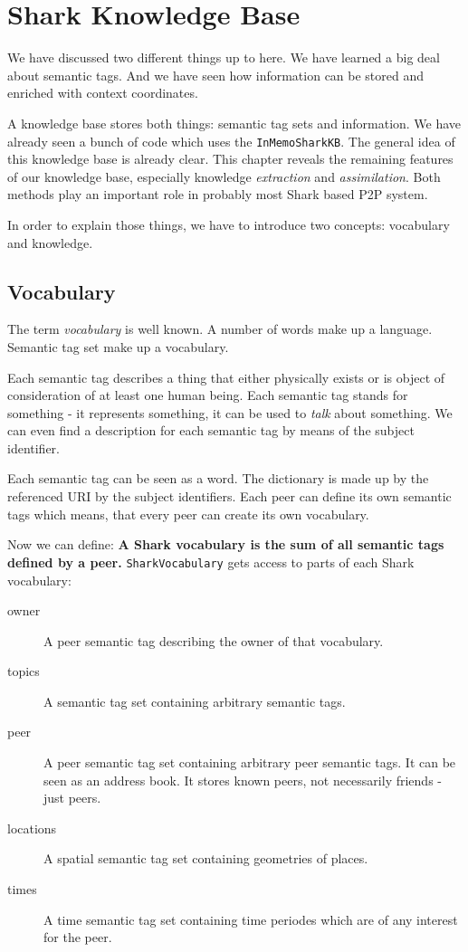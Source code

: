 \chapter{Shark Knowledge Base}
\label{sec:sharkkb}
We have discussed two different things up to here. We have learned a big deal about semantic tags. And we have seen how information can be stored and enriched with context coordinates.

A knowledge base stores both things: semantic tag sets and information. We have already seen a bunch of code which uses the {\tt InMemoSharkKB}. The general idea of this knowledge base is already clear. This chapter reveals the remaining features of our knowledge base, especially knowledge {\it extraction} and {\it assimilation}. Both methods play an important role in probably most Shark based P2P system.

In order to explain those things, we have to introduce two concepts: vocabulary and knowledge.

\section{Vocabulary}
The term {\it vocabulary} is well known. A number of words make up a language. Semantic tag set make up a vocabulary.

Each semantic tag describes a thing that either physically exists or is object of consideration of at least one human being. Each semantic tag stands for something - it represents something, it can be used to {\it talk} about something. We can even find a description for each semantic tag by means of the subject identifier. 

Each semantic tag can be seen as a word. The dictionary is made up by the referenced URI by the subject identifiers. Each peer can define its own semantic tags which means, that every peer can create its own vocabulary.

Now we can define: {\bf A Shark vocabulary is the sum of all semantic tags defined by a peer.} {\tt SharkVocabulary} gets access to parts of each Shark vocabulary:

\begin{description}
\item[owner] A peer semantic tag describing the owner of that vocabulary.
\item[topics] A semantic tag set containing arbitrary semantic tags.
\item[peer] A peer semantic tag set containing arbitrary peer semantic tags.
It can be seen as an address book. It stores known peers, not necessarily friends - just peers.
\item[locations] A spatial semantic tag set containing geometries of places.
\item[times] A time semantic tag set containing time periodes which are of any interest for the peer.
\end{description}

